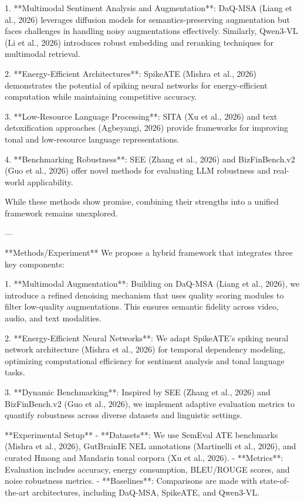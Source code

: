 1. **Multimodal Sentiment Analysis and Augmentation**: DaQ-MSA (Liang et al., 2026) leverages diffusion models for semantics-preserving augmentation but faces challenges in handling noisy augmentations effectively. Similarly, Qwen3-VL (Li et al., 2026) introduces robust embedding and reranking techniques for multimodal retrieval.

2. **Energy-Efficient Architectures**: SpikeATE (Mishra et al., 2026) demonstrates the potential of spiking neural networks for energy-efficient computation while maintaining competitive accuracy.

3. **Low-Resource Language Processing**: SITA (Xu et al., 2026) and text detoxification approaches (Agbeyangi, 2026) provide frameworks for improving tonal and low-resource language representations.

4. **Benchmarking Robustness**: SEE (Zhang et al., 2026) and BizFinBench.v2 (Guo et al., 2026) offer novel methods for evaluating LLM robustness and real-world applicability.

While these methods show promise, combining their strengths into a unified framework remains unexplored.

---

**Methods/Experiment**  
We propose a hybrid framework that integrates three key components:

1. **Multimodal Augmentation**: Building on DaQ-MSA (Liang et al., 2026), we introduce a refined denoising mechanism that uses quality scoring modules to filter low-quality augmentations. This ensures semantic fidelity across video, audio, and text modalities.

2. **Energy-Efficient Neural Networks**: We adapt SpikeATE's spiking neural network architecture (Mishra et al., 2026) for temporal dependency modeling, optimizing computational efficiency for sentiment analysis and tonal language tasks.

3. **Dynamic Benchmarking**: Inspired by SEE (Zhang et al., 2026) and BizFinBench.v2 (Guo et al., 2026), we implement adaptive evaluation metrics to quantify robustness across diverse datasets and linguistic settings.

**Experimental Setup**  
- **Datasets**: We use SemEval ATE benchmarks (Mishra et al., 2026), GutBrainIE NEL annotations (Martinelli et al., 2026), and curated Hmong and Mandarin tonal corpora (Xu et al., 2026).
- **Metrics**: Evaluation includes accuracy, energy consumption, BLEU/ROUGE scores, and noise robustness metrics.
- **Baselines**: Comparisons are made with state-of-the-art architectures, including DaQ-MSA, SpikeATE, and Qwen3-VL.

